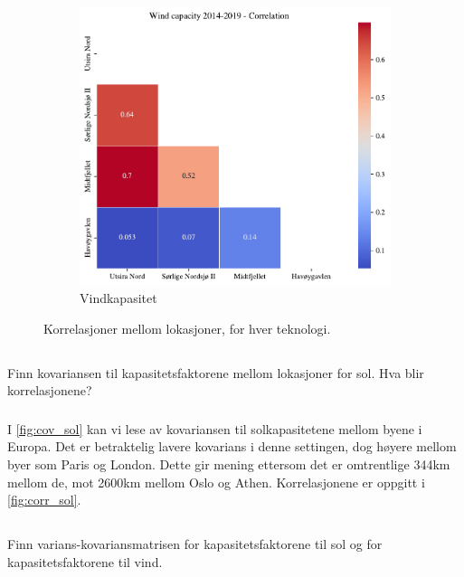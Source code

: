\documentclass{article}
\begin{document}
\begin{figure}[h]
\begin{subfigure}{.5\textwidth}
    \includegraphics[width=\linewidth]{oblig/figures/Wind/Wind capacity 2014-2019 - Correlation.pdf}
    \caption{Vindkapasitet}
    \label{fig:corr_vind}
\end{subfigure}
\caption{Korrelasjoner mellom lokasjoner, for hver teknologi.}
\label{fig:correlation}
\end{figure}

\subsection{}
Finn kovariansen til kapasitetsfaktorene mellom lokasjoner for sol. Hva blir korrelasjonene?

\subsubsection{}
I \autoref{fig:cov_sol} kan vi lese av kovariansen til solkapasitetene mellom byene i Europa.
Det er betraktelig lavere kovarians i denne settingen, dog høyere mellom byer som Paris og London.
Dette gir mening ettersom det er omtrentlige 344km mellom de, mot 2600km mellom Oslo og Athen.
Korrelasjonene er oppgitt i \autoref{fig:corr_sol}.

\subsection{}
Finn varians-kovariansmatrisen for kapasitetsfaktorene til sol og for kapasitetsfaktorene til vind.
\end{document}

